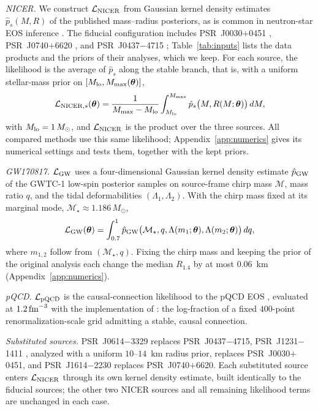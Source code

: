 \documentclass[aps,prd,twocolumn,superscriptaddress,nofootinbib,longbibliography]{revtex4-2}
\newcommand{\msun}{\ensuremath{M_\odot}}
\begin{document}
\emph{NICER.} We construct $\mathcal{L}_{\rm NICER}$ from Gaussian kernel
density estimates $\hat p_s(M,R)$ of the published mass--radius posteriors, as is
common in neutron-star EOS inference \cite{Cartaxo:2025jpi,Huang:2024rfg}. The
fiducial configuration includes PSR~J0030$+$0451 \cite{Miller:2019cac},
PSR~J0740$+$6620 \cite{Dittmann:2024mbo}, and PSR~J0437$-$4715
\cite{Choudhury:2024xbk}; Table~\ref{tab:inputs} lists the data products and
the priors of their analyses, which we keep. For each source, the likelihood is
the average of $\hat p_s$ along the stable branch, that is, with a uniform
stellar-mass prior on $[M_{\rm lo},M_{\max}(\bm\theta)]$,
\begin{equation}
\mathcal L_{{\rm NICER},s}(\bm\theta)=\frac{1}{M_{\max}-M_{\rm lo}}
\int_{M_{\rm lo}}^{M_{\max}}\hat p_s\bigl(M,R(M;\bm\theta)\bigr)\,dM,
\label{eq:nicer-like}
\end{equation}
with $M_{\rm lo}=1\,\msun$, and $\mathcal{L}_{\rm NICER}$ is the product over
the three sources. All compared methods use this same likelihood;
Appendix~\ref{app:numerics} gives its numerical settings and tests them,
together with the kept priors.

\emph{GW170817.} $\mathcal{L}_{\rm GW}$ uses a four-dimensional Gaussian kernel
density estimate $\hat p_{\rm GW}$ of the GWTC-1 low-spin posterior samples
\cite{LIGOScientific:2018mvr,LIGOScientific:2019gwtc1data} on source-frame
chirp mass $\mathcal M$, mass ratio $q$, and the tidal deformabilities
$(\Lambda_1,\Lambda_2)$. With the chirp mass fixed at its marginal mode,
$\mathcal M_\star\approx1.186\,\msun$,
\begin{equation}
\mathcal L_{\rm GW}(\bm\theta)=\int_{0.7}^{1}\hat p_{\rm GW}\bigl(\mathcal
M_\star,q,\Lambda(m_1;\bm\theta),\Lambda(m_2;\bm\theta)\bigr)\,dq,
\label{eq:gw-like}
\end{equation}
where $m_{1,2}$ follow from $(\mathcal M_\star,q)$. Fixing the chirp mass and
keeping the prior of the original analysis each change the median $R_{1.4}$ by
at most $0.06$~km (Appendix~\ref{app:numerics}).

\emph{pQCD.} $\mathcal{L}_{\rm pQCD}$ is the causal-connection likelihood
to the pQCD EOS
\cite{Komoltsev:2021jzg,Gorda:2022jvk}, evaluated at
$1.2\,{\rm fm}^{-3}$ \cite{Cartaxo:2025jpi} with the implementation of
\cite{Huang:2024rfg}: the log-fraction of a fixed $400$-point
renormalization-scale grid admitting a stable, causal connection.

\emph{Substituted sources.} PSR~J0614$-$3329 \cite{Mauviard:2025dmd}
replaces PSR~J0437$-$4715, PSR~J1231$-$1411 \cite{Salmi:2024bss}, analyzed
with a uniform $10$--$14$~km radius prior, replaces PSR~J0030$+$0451, and
PSR~J1614$-$2230
\cite{Mauviard:2026gzc} replaces PSR~J0740$+$6620. Each substituted
source enters $\mathcal{L}_{\rm NICER}$ through its own kernel density
estimate, built identically to the fiducial sources; the other two NICER
sources and all remaining likelihood terms are unchanged in each case.
\end{document}
